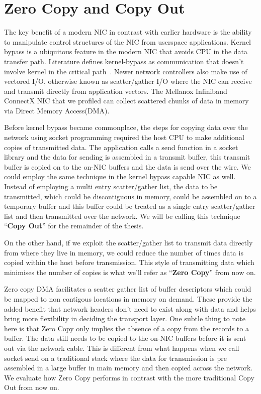 \section{Zero Copy and Copy Out}
The key benefit of a modern NIC in contrast with earlier hardware is the ability to manipulate control structures of the NIC from userspace applications. 
Kernel bypass is a ubiquitous feature in the modern NIC that avoids CPU in the data transfer path. Literature defines kernel-bypass as communication that doesn't 
involve kernel in the critical path~\cite{unetkernelbypass}. Newer network controllers also make use of vectored I/O, otherwise known as scatter/gather I/O
where the NIC can receive and transmit directly from application vectors. The Mellanox Infiniband ConnectX
NIC that we profiled can collect scattered chunks of data in memory via Direct Memory Access(DMA).

Before kernel bypass became commonplace, the steps for copying data over the network using socket programming 
required the host CPU to make additional copies of transmitted data.
The application calls a send function in a socket library and the data for sending is assembled 
in a transmit buffer, this transmit buffer is copied on to the on-NIC buffers and the data is 
send over the wire. We could employ the same technique in the kernel bypass capable NIC as well.
Instead of employing a multi entry scatter/gather list, the data to be transmitted, which could be discontiguous in memory, could be assembled on 
to a temporary buffer and this buffer could be treated as a single entry scatter/gather list
and then transmitted over the network. We will be calling this technique \enquote{\textbf{Copy Out}} for the remainder of the thesis. 

On the other hand, if we exploit the scatter/gather list to 
transmit data directly from where they live in memory, we could reduce the number of times data is copied within the host before transmission. This style of transmitting data which minimises 
the number of copies is what we'll refer as \enquote{\textbf{Zero Copy}} from now on.

Zero copy DMA facilitates a scatter gather list of buffer descriptors
which could be mapped to non contigous locations in memory on demand. These provide
the added benefit that network headers don't need to exist along with data and helps bring more flexibility 
in deciding the transport layer. One subtle thing to note here is that Zero Copy only implies the absence 
of a copy from the records to a buffer. The data still needs to be copied to the on-NIC buffers before 
it is sent out via the network cable. This is different from what happens when we call socket send on 
a traditional stack where the data for transmission is pre assembled in a large buffer in main memory 
and then copied across the network. We evaluate how Zero Copy performs in contrast 
with the more traditional Copy Out from now on.

